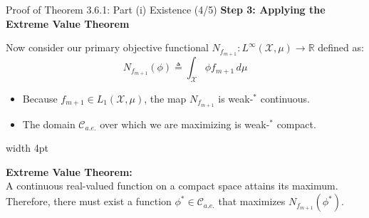 \documentclass[10pt, aspectratio=169, xcolor=dvipsnames]{beamer}
\newcommand{\lead}[1]{{\color{UniBlue}\bfseries #1}}
\begin{document}
\begin{frame}{Proof of Theorem 3.6.1: Part (i) Existence (4/5)}
    \lead{Step 3: Applying the Extreme Value Theorem}
    
    \vspace{0.3cm}
    Now consider our primary objective functional $N_{f_{m+1}} : L^\infty(\mathcal{X}, \mu) \to \mathbb{R}$ defined as:
    \[ N_{f_{m+1}}(\phi) \triangleq \int_{\mathcal{X}} \phi f_{m+1} \, d\mu \]
    
    \vspace{0.3cm}
    \begin{itemize}
        \item[{ \tikz\fill[Teal] (0,0) circle (2pt); }] Because $f_{m+1} \in L_1(\mathcal{X}, \mu)$, the map $N_{f_{m+1}}$ is weak-$^\ast$ continuous.
        \vspace{0.2cm}
        \item[{ \tikz\fill[Teal] (0,0) circle (2pt); }] The domain $\mathcal{C}_{a.e.}$ over which we are maximizing is weak-$^\ast$ compact.
    \end{itemize}
    
    \vspace{0.4cm}
    \noindent
    {\color{Teal}\vrule width 4pt}%
    \hspace{10pt}%
    \begin{minipage}{\dimexpr\textwidth-14pt\relax}
        \color{Slate}
        \textbf{Extreme Value Theorem:}\\
        A continuous real-valued function on a compact space attains its maximum. Therefore, there must exist a function $\phi^* \in \mathcal{C}_{a.e.}$ that maximizes $N_{f_{m+1}}(\phi^*)$.
    \end{minipage}
\end{frame}
\end{document}
